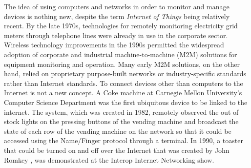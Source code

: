\documentclass[conference]{IEEEtran}
\begin{document}
The idea of using computers and networks in order to monitor and manage devices
is nothing new, despite the term \textit{Internet of Things} being relatively
recent. By the late 1970s, technologies for remotely monitoring electricity grid
meters through telephone lines were already in use in the corporate sector.
Wireless technology improvements in the 1990s permitted the widespread adoption
of corporate and industrial machine-to-machine (M2M) solutions for equipment
monitoring and operation. Many early M2M solutions, on the other hand, relied
on proprietary purpose-built networks or industry-specific standards rather than
Internet standards. To connect devices other than computers to the Internet
is not a new concept. A Coke machine at Carnegie Mellon University's Computer
Science Department \cite{EverhartInteresting} was the first ubiquitous device
to be linked to the internet. The system, which was created in 1982, remotely
observed the out of stock lights on the pressing buttons of the vending machine
and broadcast the state of each row of the vending machine on the network so
that it could be accessed using the Name/Finger protocol through a terminal.
In 1990, a toaster that could be turned on and off over the Internet that was
created by John Romkey \cite{RomkeyToast}, was demonstrated at the Interop
Internet Networking show.

\end{document}
